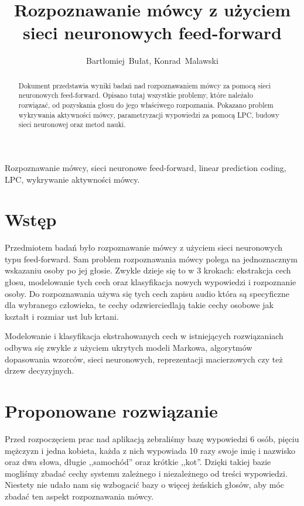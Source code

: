 \documentclass[journal]{IEEEtran}
\title{Rozpoznawanie mówcy z użyciem sieci neuronowych feed-forward}
\author{Bartłomiej~Bułat, Konrad~Malawski}
\begin{document}

\maketitle


\begin{abstract}
Dokument przedstawia wyniki badań nad rozpoznawaniem mówcy za pomocą sieci
neuronowych feed-forward. Opisano tutaj wszystkie problemy, które należało
rozwiązać, od pozyskania głosu do jego właściwego rozpoznania. Pokazano problem
wykrywania aktywności mówcy, parametryzacji wypowiedzi za pomocą LPC, budowy 
sieci neuronowej oraz metod nauki.
\end{abstract}

\begin{IEEEkeywords}
Rozpoznawanie mówcy, sieci neuronowe feed-forward, linear prediction 
coding, LPC, wykrywanie aktywności mówcy.
\end{IEEEkeywords}

\section{Wstęp}

Przedmiotem badań było rozpoznawanie mówcy z użyciem sieci neuronowych typu
feed-forward. Sam problem rozpoznawania mówcy polega na jednoznacznym wskazaniu
osoby po jej głosie. Zwykle dzieje się to w 3 krokach: ekstrakcja cech głosu,
modelowanie tych cech oraz klasyfikacja nowych wypowiedzi i rozpoznanie osoby.
Do rozpoznawania używa się tych cech zapisu audio która są specyficzne dla
wybranego człowieka, te cechy odzwierciedlają takie cechy osobowe jak kształt
i rozmiar ust lub krtani.

Modelowanie i klasyfikacja ekstrahowanych cech w istniejących rozwiązaniach
odbywa się zwykle z użyciem ukrytych modeli Markowa, algorytmów dopasowania
wzorców, sieci neuronowych, reprezentacji macierzowych czy też drzew
decyzyjnych.

\section{Proponowane rozwiązanie}

Przed rozpoczęciem prac nad aplikacją zebraliśmy bazę wypowiedzi 6 osób, pięciu
mężczyzn i jedna kobieta, każda
z nich wypowiada 10 razy swoje imię i nazwisko oraz dwa słowa, długie
,,samochód'' oraz krótkie ,,kot''. Dzięki takiej bazie mogliśmy zbadać cechy
systemu zależnego i niezależnego od treści wypowiedzi. Niestety nie udało nam
się wzbogacić bazy o więcej żeńskich głosów, aby móc zbadać ten aspekt
rozpoznawania mówcy.
\end{document}
